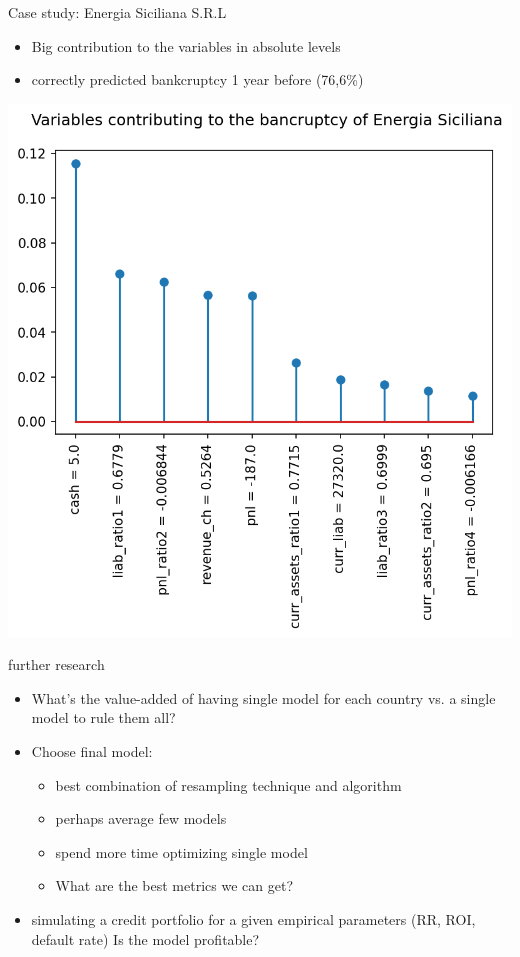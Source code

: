 \documentclass{beamer}
\begin{document}
\begin{frame}{Case study: Energia Siciliana S.R.L}

\begin{itemize}
\item Big contribution to the variables in absolute levels
\item correctly predicted bankcruptcy 1 year before (76,6\%)
\end{itemize}


\begin{center}
\includegraphics[scale=0.4]{img/energia_plot.png}
\end{center}
\end{frame}

\begin{frame}{further research}
\begin{itemize}
\item What's the value-added of having single model for each country vs. a single model to rule them all?

\item Choose final model:

\begin{itemize}
\item best combination of resampling technique and algorithm
\item perhaps average few models
\item spend more time optimizing single model
\item What are the best metrics we can get?
\end{itemize}

\item simulating a credit portfolio for a given empirical parameters (RR, ROI, default rate) Is the model profitable?
\end{itemize}
\end{frame}
\end{document}
